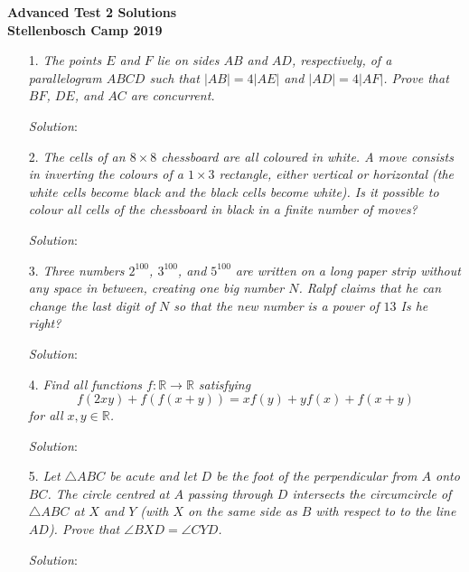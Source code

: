 \documentclass{article}
\begin{document}
\begin{center}
  \textbf{\Large Advanced Test 2 Solutions}
  \\ \vspace{1em}
  \textbf{\large Stellenbosch Camp 2019}
\end{center}


\begin{enumerate}[1.]

\item[1.] %
\textit{The points $E$ and $F$ lie on sides $AB$ and $AD$, respectively, of a parallelogram $ABCD$ such that $|AB| = 4|AE|$ and $|AD| = 4|AF|$.
Prove that $BF$, $DE$, and $AC$ are concurrent.}

\textit{Solution}:



\item[2.] %
\textit{The cells of an $8 \times 8$ chessboard are all coloured in white.
A move consists in inverting the colours of a $1 \times 3$ rectangle, either vertical or horizontal (the white cells become black and the black cells become white).
Is it possible to colour all cells of the chessboard in black in a finite number of moves?}

\textit{Solution}:


\item[3.] %
\textit{Three numbers $2^{100}$, $3^{100}$, and $5^{100}$ are written on a long paper strip without any space in between, creating one big number $N$.
Ralpf claims that he can change the last digit of $N$ so that the new number is a power of $13$
Is he right?}

\textit{Solution}:


\item[4.] %
\textit{Find all functions $f: \mathbb{R} \to \mathbb{R}$ satisfying
\[ f(2xy) +f(f(x+y)) = xf(y) + yf(x) +f(x+y) \]
for all $x,y \in \mathbb{R}$.}

\textit{Solution}:


\item[5.] %
\textit{Let $\triangle ABC$ be acute and let $D$ be the foot of the perpendicular from $A$ onto $BC$.
The circle centred at $A$ passing through $D$ intersects the circumcircle of $\triangle ABC$ at $X$ and $Y$ (with $X$ on the same side as $B$ with respect to to the line $AD$).
Prove that $\angle BXD = \angle CYD$.}

\textit{Solution}: 


\end{enumerate}
\end{document}
